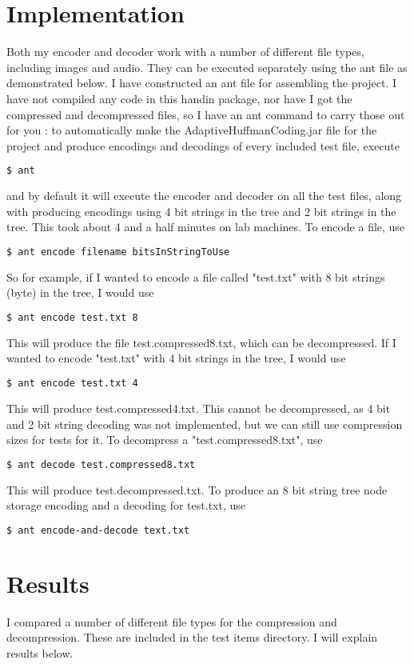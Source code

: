 \documentclass[12pt, letterpaper]{article}
\begin{document}
\section{Implementation}
Both my encoder and decoder work with a number of different file types, including images and audio. They can be executed separately using the ant file as demonstrated below.
I have constructed an ant file for assembling the project. I have not compiled any code in this handin package, nor have I got the compressed and decompressed files, so I have an ant command to carry those out for you : to automatically make the AdaptiveHuffmanCoding.jar file for the project and produce encodings and decodings of every included test file, execute
\begin{lstlisting}[language=bash]
  $ ant
\end{lstlisting}
and by default it will execute the encoder and decoder on all the test files, along with producing encodings using 4 bit strings in the tree and 2 bit strings in the tree. This took about 4 and a half minutes on lab machines.
To encode a file, use
\begin{lstlisting}[language=bash]
  $ ant encode filename bitsInStringToUse
\end{lstlisting}
So for example, if I wanted to encode a file called "test.txt" with 8 bit strings (byte) in the tree, I would use
\begin{lstlisting}[language=bash]
  $ ant encode test.txt 8
\end{lstlisting}
This will produce the file test.compressed8.txt, which can be decompressed. If I wanted to encode "test.txt" with 4 bit strings in the tree, I would use
\begin{lstlisting}[language=bash]
  $ ant encode test.txt 4
\end{lstlisting}
This will produce test.compressed4.txt. This cannot be decompressed, as 4 bit and 2 bit string decoding was not implemented, but we can still use compression sizes for tests for it.
To decompress a "test.compressed8.txt", use 
\begin{lstlisting}[language=bash]
  $ ant decode test.compressed8.txt
\end{lstlisting}
This will produce test.decompressed.txt. To produce an 8 bit string tree node storage encoding and a decoding for test.txt, use
\begin{lstlisting}[language=bash]
  $ ant encode-and-decode text.txt
\end{lstlisting}
\section{Results}
I compared a number of different file types for the compression and decompression. These are included in the test items directory. I will explain results below.
\end{document}

